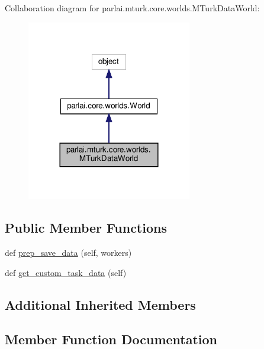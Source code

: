 Collaboration diagram for parlai.\+mturk.\+core.\+worlds.\+M\+Turk\+Data\+World\+:
\nopagebreak
\begin{figure}[H]
\begin{center}
\leavevmode
\includegraphics[width=204pt]{classparlai_1_1mturk_1_1core_1_1worlds_1_1MTurkDataWorld__coll__graph}
\end{center}
\end{figure}
\subsection*{Public Member Functions}
\begin{DoxyCompactItemize}
\item 
def \hyperlink{classparlai_1_1mturk_1_1core_1_1worlds_1_1MTurkDataWorld_a13f5b85f9694627df2e181267588d4dc}{prep\+\_\+save\+\_\+data} (self, workers)
\item 
def \hyperlink{classparlai_1_1mturk_1_1core_1_1worlds_1_1MTurkDataWorld_a9aefd4525fc9b34aa6f7309e78a8e231}{get\+\_\+custom\+\_\+task\+\_\+data} (self)
\end{DoxyCompactItemize}
\subsection*{Additional Inherited Members}


\subsection{Member Function Documentation}
\mbox{\label{classparlai_1_1mturk_1_1core_1_1worlds_1_1MTurkDataWorld_a9aefd4525fc9b34aa6f7309e78a8e231}} 
